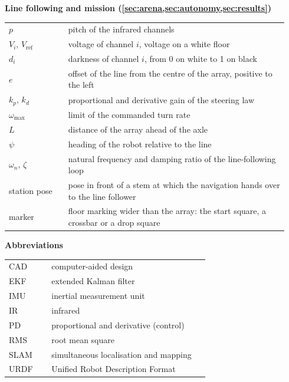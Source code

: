 \noindent\textbf{Line following and mission (\cref{sec:arena,sec:autonomy,sec:results})}
\begin{center}
\begin{tabular}{@{}p{0.2\linewidth}p{0.74\linewidth}@{}}
$p$ & pitch of the infrared channels \\
$V_i$, $V_{\mathrm{ref}}$ & voltage of channel $i$, voltage on a white floor \\
$d_i$ & darkness of channel $i$, from 0 on white to 1 on black \\
$e$ & offset of the line from the centre of the array, positive to the left \\
$k_p$, $k_d$ & proportional and derivative gain of the steering law \\
$\omega_{\max}$ & limit of the commanded turn rate \\
$L$ & distance of the array ahead of the axle \\
$\psi$ & heading of the robot relative to the line \\
$\omega_n$, $\zeta$ & natural frequency and damping ratio of the line-following loop \\
station pose & pose in front of a stem at which the navigation hands over to the line follower \\
marker & floor marking wider than the array: the start square, a crossbar or a drop square \\
\end{tabular}
\end{center}

\noindent\textbf{Abbreviations}
\begin{center}
\begin{tabular}{@{}p{0.2\linewidth}p{0.74\linewidth}@{}}
CAD & computer-aided design \\
EKF & extended Kalman filter \\
IMU & inertial measurement unit \\
IR & infrared \\
PD & proportional and derivative (control) \\
RMS & root mean square \\
SLAM & simultaneous localisation and mapping \\
URDF & Unified Robot Description Format \\
\end{tabular}
\end{center}
\clearpage
